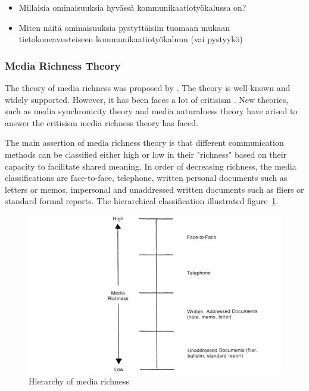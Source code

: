 \documentclass[english,12pt,a4paper,pdftex]{article}
\begin{document}
\begin{itemize}
\item Millaisia ominaisuuksia hyvässä kommunikaatiotyökalussa on?
\item Miten näitä ominaisuuksia pystyttäisiin tuomaan mukaan tietokoneavusteiseen kommunikaatiotyökaluun (vai pystyykö)
\end{itemize}

\subsubsection{Media Richness Theory}

The theory of media richness was proposed by \citet{daft1986}. The theory is well-known and widely supported. However, it has been faces a lot of critisism \citep{dennis1999} \citep{korkala2006}. New theories, such as media synchronicity theory and media naturalness theory have arised to answer the critisism media richness theory has faced.

The main assertion of media richness theory is that different communication methods can be classified either high or low in their "richness" based on their capacity to facilitate shared meaning. In order of decreasing richness, the media classifications are face-to-face, telephone, written personal documents such as letters or memos, impersonal and unaddressed written documents such as fliers or standard formal reports. The hierarchical classification illustrated figure~\ref{fig:hierarchy_of_media_richness}.

\begin{figure}[htb]
\begin{center}
\includegraphics[width=1.0\textwidth]{hierarchy_of_media_richness.png}
\end{center}
\caption{Hierarchy of media richness \citep{daft1987}}
\label{fig:hierarchy_of_media_richness}
\end{figure}
\end{document}
